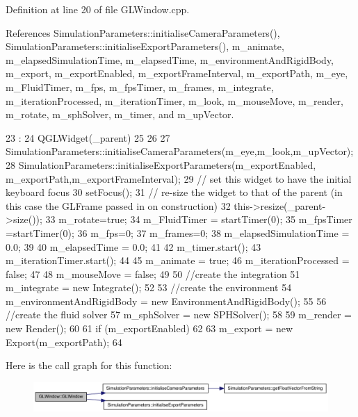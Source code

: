 Definition at line 20 of file GLWindow.cpp.



References SimulationParameters::initialiseCameraParameters(), SimulationParameters::initialiseExportParameters(), m\_\-animate, m\_\-elapsedSimulationTime, m\_\-elapsedTime, m\_\-environmentAndRigidBody, m\_\-export, m\_\-exportEnabled, m\_\-exportFrameInterval, m\_\-exportPath, m\_\-eye, m\_\-FluidTimer, m\_\-fps, m\_\-fpsTimer, m\_\-frames, m\_\-integrate, m\_\-iterationProcessed, m\_\-iterationTimer, m\_\-look, m\_\-mouseMove, m\_\-render, m\_\-rotate, m\_\-sphSolver, m\_\-timer, and m\_\-upVector.




\begin{DoxyCode}
23                     :
24                     QGLWidget(_parent)
25 {
26 
27     SimulationParameters::initialiseCameraParameters(m_eye,m_look,m_upVector);
28     SimulationParameters::initialiseExportParameters(m_exportEnabled,
      m_exportPath,m_exportFrameInterval);
29     // set this widget to have the initial keyboard focus
30     setFocus();
31     // re-size the widget to that of the parent (in this case the GLFrame passed 
      in on construction)
32     this->resize(_parent->size());
33     m_rotate=true;
34     m_FluidTimer = startTimer(0);
35     m_fpsTimer =startTimer(0);
36     m_fps=0;
37     m_frames=0;
38     m_elapsedSimulationTime = 0.0;
39 
40     m_elapsedTime = 0.0;
41 
42     m_timer.start();
43     m_iterationTimer.start();
44 
45     m_animate = true;
46     m_iterationProcessed = false;
47 
48     m_mouseMove = false;
49 
50     //create the integration
51     m_integrate = new Integrate();
52 
53     //create the environment
54     m_environmentAndRigidBody = new EnvironmentAndRigidBody();
55 
56     //create the fluid solver
57     m_sphSolver = new SPHSolver();
58 
59     m_render = new Render();
60 
61     if (m_exportEnabled)
62     {
63         m_export = new Export(m_exportPath);
64     }
}
\end{DoxyCode}




Here is the call graph for this function:\nopagebreak
\begin{figure}[H]
\begin{center}
\leavevmode
\includegraphics[width=350pt]{class_g_l_window_a8dfc33113be0a86a53ddbea054f75292_cgraph}
\end{center}
\end{figure}


